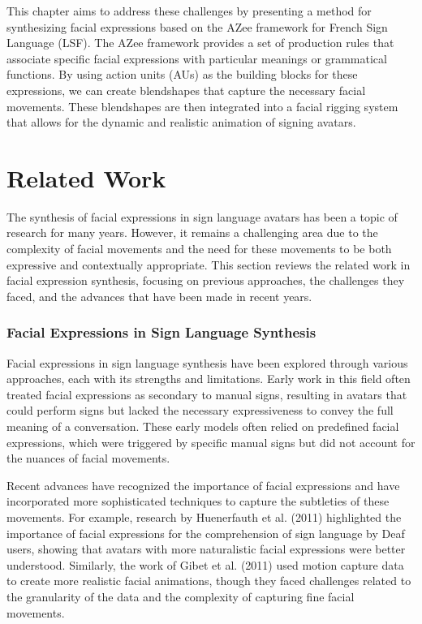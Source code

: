 \documentclass[../../main.tex]{subfiles}
\begin{document}
This chapter aims to address these challenges by presenting a method for synthesizing facial expressions based on the AZee framework for French Sign Language (LSF). The AZee framework provides a set of production rules that associate specific facial expressions with particular meanings or grammatical functions. By using action units (AUs) as the building blocks for these expressions, we can create blendshapes that capture the necessary facial movements. These blendshapes are then integrated into a facial rigging system that allows for the dynamic and realistic animation of signing avatars.

\section{Related Work}

The synthesis of facial expressions in sign language avatars has been a topic of research for many years. However, it remains a challenging area due to the complexity of facial movements and the need for these movements to be both expressive and contextually appropriate. This section reviews the related work in facial expression synthesis, focusing on previous approaches, the challenges they faced, and the advances that have been made in recent years.

\subsubsection{Facial Expressions in Sign Language Synthesis}

Facial expressions in sign language synthesis have been explored through various approaches, each with its strengths and limitations. Early work in this field often treated facial expressions as secondary to manual signs, resulting in avatars that could perform signs but lacked the necessary expressiveness to convey the full meaning of a conversation. These early models often relied on predefined facial expressions, which were triggered by specific manual signs but did not account for the nuances of facial movements.

Recent advances have recognized the importance of facial expressions and have incorporated more sophisticated techniques to capture the subtleties of these movements. For example, research by Huenerfauth et al. (2011) highlighted the importance of facial expressions for the comprehension of sign language by Deaf users, showing that avatars with more naturalistic facial expressions were better understood. Similarly, the work of Gibet et al. (2011) used motion capture data to create more realistic facial animations, though they faced challenges related to the granularity of the data and the complexity of capturing fine facial movements.
\end{document}
